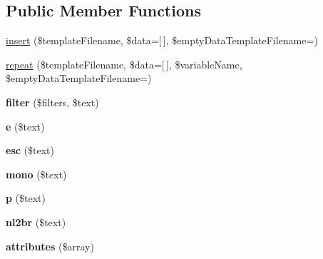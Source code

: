 \subsection*{Public Member Functions}
\begin{DoxyCompactItemize}
\item 
\mbox{\hyperlink{interface_pes_1_1_view_1_1_renderer_1_1_php_template_functions_interface_ae62d97adedce8c34fa312e0f63b1df26}{insert}} (\$template\+Filename, \$data=\mbox{[}$\,$\mbox{]}, \$empty\+Data\+Template\+Filename=\textquotesingle{}\textquotesingle{})
\item 
\mbox{\hyperlink{interface_pes_1_1_view_1_1_renderer_1_1_php_template_functions_interface_a8870e42f6c064494fd5a8c1aeb0855f9}{repeat}} (\$template\+Filename, \$data=\mbox{[}$\,$\mbox{]}, \$variable\+Name, \$empty\+Data\+Template\+Filename=\textquotesingle{}\textquotesingle{})
\item 
\mbox{\label{interface_pes_1_1_view_1_1_renderer_1_1_php_template_functions_interface_ae02e6602dc1424e5838d714fe916d90a}} 
{\bfseries filter} (\$filters, \$text)
\item 
\mbox{\label{interface_pes_1_1_view_1_1_renderer_1_1_php_template_functions_interface_a8e9e812ec353d68946a9296612bab8f4}} 
{\bfseries e} (\$text)
\item 
\mbox{\label{interface_pes_1_1_view_1_1_renderer_1_1_php_template_functions_interface_ae125f4b190587bfb6f9e7d3b6f300c0a}} 
{\bfseries esc} (\$text)
\item 
\mbox{\label{interface_pes_1_1_view_1_1_renderer_1_1_php_template_functions_interface_aa9982f89b18fbc31667b4e84ea58a4b1}} 
{\bfseries mono} (\$text)
\item 
\mbox{\label{interface_pes_1_1_view_1_1_renderer_1_1_php_template_functions_interface_a9f812a313e2e3ca9790044fa3f5bdc95}} 
{\bfseries p} (\$text)
\item 
\mbox{\label{interface_pes_1_1_view_1_1_renderer_1_1_php_template_functions_interface_a435797068562a5dcaad5066f944f836c}} 
{\bfseries nl2br} (\$text)
\item 
\mbox{\label{interface_pes_1_1_view_1_1_renderer_1_1_php_template_functions_interface_acedcd582a2c5c5f5ff9ea915a2ba9ee3}} 
{\bfseries attributes} (\$array)
\end{DoxyCompactItemize}


